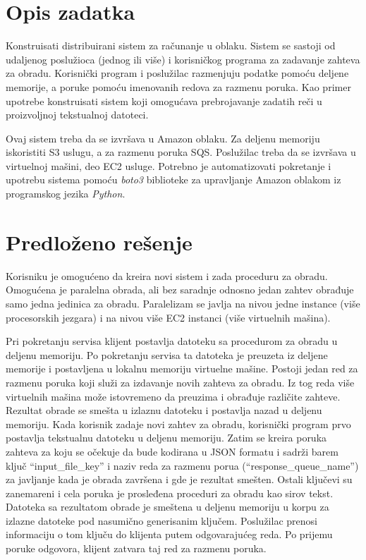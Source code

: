 \documentclass[a4paper]{article}
\begin{document}



\tableofcontents

\newpage
\section{Opis zadatka}

Konstruisati distribuirani sistem za računanje u oblaku. Sistem se sastoji od
udaljenog poslužioca (jednog ili više) i korisničkog programa za zadavanje
zahteva za obradu. Korisnički program i poslužilac razmenjuju podatke pomoću
deljene memorije, a poruke pomoću imenovanih redova za razmenu poruka. Kao
primer upotrebe konstruisati sistem koji omogućava prebrojavanje zadatih reči u
proizvoljnoj tekstualnoj datoteci.

Ovaj sistem treba da se izvršava u Amazon oblaku. Za deljenu memoriju
iskoristiti S3 uslugu, a za razmenu poruka SQS. Poslužilac treba da se izvršava
u virtuelnoj mašini, deo EC2 usluge. Potrebno je automatizovati pokretanje i
upotrebu sistema pomoću {\em boto3} biblioteke za upravljanje Amazon oblakom iz
programskog jezika \mbox{\em Python}.

\section{Predloženo rešenje}

Korisniku je omogućeno da kreira novi sistem i zada proceduru za obradu.
Omogućena je paralelna obrada, ali bez saradnje odnosno jedan zahtev obrađuje
samo jedna jedinica za obradu. Paralelizam se javlja na nivou jedne instance
(više procesorskih jezgara) i na nivou više EC2 instanci (više virtuelnih
mašina).

Pri pokretanju servisa klijent postavlja datoteku sa procedurom za obradu u
deljenu memoriju. Po pokretanju servisa ta datoteka je preuzeta iz deljene
memorije i postavljena u lokalnu memoriju virtuelne mašine. Postoji jedan red za
razmenu poruka koji služi za izdavanje novih zahteva za obradu. Iz tog reda više
virtuelnih mašina može istovremeno da preuzima i obrađuje različite zahteve.
Rezultat obrade se smešta u izlaznu datoteku i postavlja nazad u deljenu
memoriju. Kada korisnik zadaje novi zahtev za obradu, korisnički program prvo
postavlja tekstualnu datoteku u deljenu memoriju. Zatim se kreira poruka zahteva
za koju se očekuje da bude kodirana u JSON formatu i sadrži barem ključ
``input\_file\_key'' i naziv reda za razmenu porua (``response\_queue\_name'')
za javljanje kada je obrada završena i gde je rezultat smešten. Ostali ključevi
su zanemareni i cela poruka je prosleđena proceduri za obradu kao sirov tekst.
Datoteka sa rezultatom obrade je smeštena u deljenu memoriju u korpu za izlazne
datoteke pod nasumično generisanim ključem. Poslužilac prenosi informaciju o tom
ključu do klijenta putem odgovarajućeg reda. Po prijemu poruke odgovora, klijent
zatvara taj red za razmenu poruka.
\end{document}
